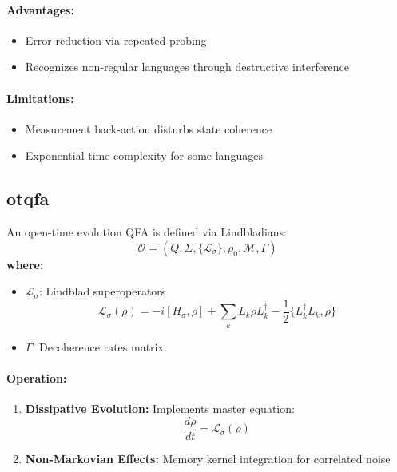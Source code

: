 \paragraph{Advantages:}
\begin{itemize}
    \item Error reduction via repeated probing
    \item Recognizes non-regular languages through destructive interference
\end{itemize}

\paragraph{Limitations:}
\begin{itemize}
    \item Measurement back-action disturbs state coherence
    \item Exponential time complexity for some languages
\end{itemize}

\subsection{\acrfull{otqfa}}
\label{subsec:otqfa}

\begin{definition}
An open-time evolution QFA is defined via Lindbladians:
\[
\mathcal{O} = (Q, \Sigma, \{\mathcal{L}_\sigma\}, \rho_0, \mathcal{M}, \Gamma)
\]
\textbf{where:}
\begin{itemize}
    \item $\mathcal{L}_\sigma$: Lindblad superoperators
    \[
    \mathcal{L}_\sigma(\rho) = -i[H_\sigma,\rho] + \sum_k L_k\rho L_k^\dagger - \frac{1}{2}\{L_k^\dagger L_k, \rho\}
    \]
    \item $\Gamma$: Decoherence rates matrix
\end{itemize}
\end{definition}

\paragraph{Operation:}
\begin{enumerate}
    \item \textbf{Dissipative Evolution:} Implements master equation:
    \[
    \frac{d\rho}{dt} = \mathcal{L}_\sigma(\rho)
    \]
    \item \textbf{Non-Markovian Effects:} Memory kernel integration for correlated noise
\end{enumerate}

